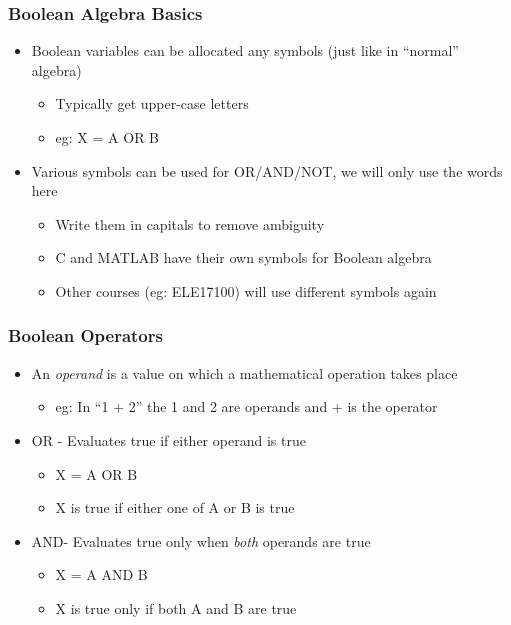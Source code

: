 \documentclass[14pt]{beamer}
\begin{document}
\begin{frame} %
\frametitle{Boolean Algebra Basics}
\begin{itemize}
\item Boolean variables can be allocated any symbols (just like in ``normal'' algebra)
	\begin{itemize}
		\item Typically get upper-case letters
		\item eg: X = A OR B
	\end{itemize}
\item Various symbols can be used for OR/AND/NOT, we will only use the words here
	\begin{itemize}
		\item Write them in capitals to remove ambiguity
		\item C and MATLAB have their own symbols for Boolean algebra
		\item Other courses (eg: ELE17100) will use different symbols again
	\end{itemize}
\end{itemize}
\end{frame}

\begin{frame} %
\frametitle{Boolean Operators}
\begin{itemize}
\item An \textit{operand} is a value on which a mathematical operation takes place
	\begin{itemize}
		\item eg: In ``1 + 2'' the 1 and 2 are operands and + is the operator
	\end{itemize}
\item OR - Evaluates true if either operand is true
	\begin{itemize}
		\item X = A OR B
		\item X is true if either one of A or B is true
	\end{itemize}
\item AND- Evaluates true only when \textit{both} operands are true
	\begin{itemize}
		\item X = A AND B
		\item X is true only if both A and B are true
	\end{itemize}
\end{itemize}
\end{frame}
\end{document}
